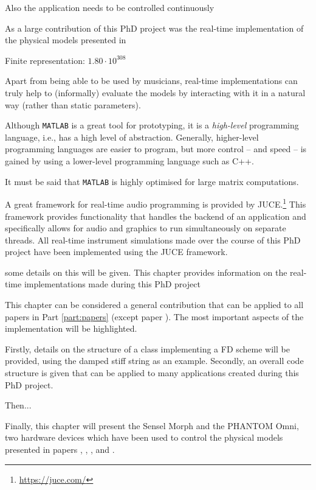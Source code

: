 Also the application needs to be controlled continuously

As a large contribution of this PhD project was the real-time implementation of the physical models presented in 

Finite representation: $1.80\cdot 10^{308}$


Apart from being able to be used by musicians, real-time implementations can truly help to (informally) evaluate the models by interacting with it in a natural way (rather than static parameters).






Although \texttt{MATLAB} is a great tool for prototyping, it is a \textit{high-level} programming language, i.e., has a high level of abstraction. Generally, higher-level programming languages are easier to program, but more control -- and speed -- is gained by using a lower-level programming language such as C++.

It must be said that \texttt{MATLAB} is highly optimised for large matrix computations.

A great framework for real-time audio programming is provided by JUCE.\footnote{\url{https://juce.com/}} This framework provides functionality that handles the backend of  an application and specifically allows for audio and graphics to run simultaneously on separate threads. All real-time instrument simulations made over the course of this PhD project have been implemented using the JUCE framework. 


some details on this will be given. 
This chapter provides information on the real-time implementations made during this PhD project

This chapter can be considered a general contribution that can be applied to all papers in Part \ref{part:papers} (except paper \citeP[G]). The most important aspects of the implementation will be highlighted.

Firstly, details on the structure of a class implementing a FD scheme will be provided, using the damped stiff string as an example. Secondly, an overall code structure is given that can be applied to many applications created during this PhD project.   

Then... 

Finally, this chapter will present the Sensel Morph and the PHANTOM Omni, two hardware devices which have been used to control the physical models presented in papers \citeP[A], \citeP[B], \citeP[C], \citeP[D] and \citeP[E].

